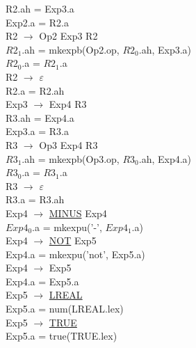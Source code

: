 \documentclass[\main/MemoriaPL.tex]{subfiles}
\begin{document}
    \hspace{5mm}R2.ah = Exp3.a\\
    \hspace{5mm}Exp2.a = R2.a\\
    R2 $\rightarrow$ Op2 Exp3 R2\\
    \hspace{5mm}$R2_1$.ah = mkexpb(Op2.op, $R2_0$.ah, Exp3.a)\\
    \hspace{5mm}$R2_0$.a = $R2_1$.a\\
    R2 $\rightarrow$ $\varepsilon$\\
    \hspace{5mm}R2.a = R2.ah\\
    Exp3 $\rightarrow$ Exp4 R3\\
    \hspace{5mm}R3.ah = Exp4.a\\
    \hspace{5mm}Exp3.a = R3.a\\
    R3 $\rightarrow$ Op3 Exp4 R3\\
    \hspace{5mm}$R3_1$.ah = mkexpb(Op3.op, $R3_0$.ah, Exp4.a)\\
    \hspace{5mm}$R3_0$.a = $R3_1$.a\\
    R3 $\rightarrow$ $\varepsilon$\\
    \hspace{5mm}R3.a = R3.ah\\
    Exp4 $\rightarrow$ \underline{MINUS} Exp4\\
    \hspace{5mm}$Exp4_0$.a = mkexpu('-', $Exp4_1$.a)\\
    Exp4 $\rightarrow$ \underline{NOT} Exp5\\
    \hspace{5mm}Exp4.a = mkexpu('not', Exp5.a)\\
    Exp4 $\rightarrow$ Exp5\\
    \hspace{5mm}Exp4.a = Exp5.a\\
    Exp5 $\rightarrow$ \underline{LREAL}\\
    \hspace*{5mm}Exp5.a = num(LREAL.lex)\\
    Exp5 $\rightarrow$ \underline{TRUE}\\
    \hspace*{5mm}Exp5.a = true(TRUE.lex)\\
\end{document}
